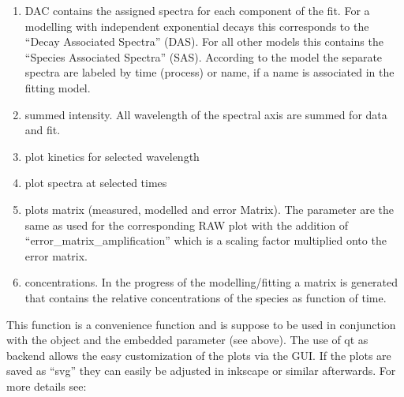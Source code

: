 \documentclass[letterpaper,10pt,english]{sphinxmanual}
\begin{document}
\begin{enumerate}
%
\item {} 
DAC contains the assigned spectra for each component of the fit. For
a modelling with independent exponential decays this corresponds to
the “Decay Associated Spectra” (DAS). For all other models this
contains the “Species Associated Spectra” (SAS). According to the
model the separate spectra are labeled by time (process) or name, if
a name is associated in the fitting model.

\item {} 
summed intensity. All wavelength of the spectral axis are summed for
data and fit.

\item {} 
plot kinetics for selected wavelength

\item {} 
plot spectra at selected times

\item {} 
plots matrix (measured, modelled and error Matrix). The parameter are
the same as used for the corresponding RAW plot with the addition of
“error\_matrix\_amplification” which is a scaling factor multiplied
onto the error matrix.

\item {} 
concentrations. In the progress of the modelling/fitting a matrix is
generated that contains the relative concentrations of the species
as function of time.

\end{enumerate}

This function is a convenience function and is suppose to be used in
conjunction with the object and the embedded parameter (see above). The
use of qt as backend allows the easy customization of the plots via the
GUI. If the plots are saved as “svg” they can easily be adjusted in
inkscape or similar afterwards.
For more details see: {\hyperref[\detokenize{plot_func:plot_func.TA.Plot_fit_output}]{}}
\end{document}
